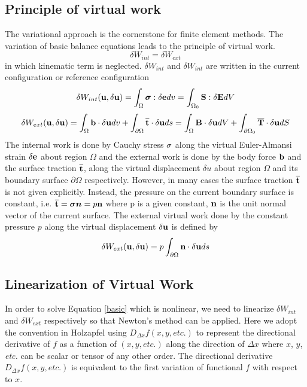 \subsection{Principle of virtual work}
The variational approach is the cornerstone for finite element methods. The variation of basic balance equations leads to the principle of virtual work.
\begin{equation} \label{basic}
\delta{W_{int}} = \delta{W_{ext}}
\end{equation}
in which kinematic term is neglected. $\delta{W_{int}}$ and $\delta{W_{int}}$ are written in the current configuration or reference configuration
\begin{equation} \label{Wint}
\delta W_{int}(\bold{u}, \delta\bold{u}) = \int_\Omega \boldsymbol\sigma : \delta\bold{e}dv = \int_{\Omega_{0}}\bold{S} : \delta\bold{E}dV
\end{equation}
\begin{equation} \label{Wext}
\delta W_{ext}(\bold{u}, \delta\bold{u}) = \int_\Omega\bold{b}\cdot\delta\bold{u}dv +  \int_{\partial\Omega}\overline{\bold{t}}\cdot\delta{\bold{u}}ds = \int_\Omega\bold{B}\cdot\delta\bold{u}dV +  \int_{\partial{\Omega_0}}\overline{\bold{T}}\cdot\delta{\bold{u}}dS
\end{equation}
The internal work is done by Cauchy stress $\bold\sigma$ along the virtual Euler-Almansi strain $\delta\bold{e}$ about region $\Omega$ and the external work is done by the body force $\bold{b}$ and the surface traction $\overline{\bold{t}}$, along the virtual displacement $\delta{u}$ about region $\Omega$ and its boundary surface $\partial\Omega$ respectively. However, in many cases the surface traction $\overline{\bold{t}}$ is not given explicitly. Instead, the pressure on the current boundary surface is constant, i.e. $\overline{\bold{t}} = \boldsymbol{\sigma{n}} = p\bold{n}$ where p is a given constant, $\bold{n}$ is the unit normal vector of the current surface. The external virtual work done by the constant pressure $p$ along the virtual displacement $\delta{\bold{u}}$ is defined by
\begin{equation} \label{Wext2}
\delta{W_{ext}}(\bold{u}, \delta{\bold{u}}) = p\int_{\partial\Omega} \bold{n}\cdot\delta{\bold{u}}ds
\end{equation}


\subsection{Linearization of Virtual Work}
In order to solve Equation \ref{basic} which is nonlinear, we need to linearize $\delta{W_{int}}$ and $\delta{W_{ext}}$ respectively so that Newton's method can be applied. Here we adopt the convention in Holzapfel using $D_{\Delta{x}}f(x, y, \textit{etc.})$ to represent the directional derivative of $f$ as a function of $(x, y, \textit{etc.})$ along the direction of $\Delta{x}$ where $x$, $y$, \textit{etc.} can be scalar or tensor of any other order. The directional derivative $D_{\Delta{x}}f(x, y, \textit{etc.})$ is equivalent to the first variation of functional $f$ with respect to $x$.

